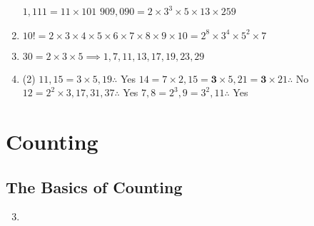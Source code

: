 \documentclass[12pt, A4]{article}
\begin{document}
\begin{enumerate}
\begin{tasks}
							\task
								\(1,111 = 11 \times 101\)
							\task
								\(909,090 = 2 \times 3^3 \times 5 \times 13 \times 259\)
						\end{tasks}
					\setcounter{enumi}{4}
					\item
						\(10! = 2 \times 3 \times 4 \times 5 \times 6 \times 7 \times 8 \times 9 \times 10 = 2^8 \times 3^4 \times 5^2 \times 7\)
					\setcounter{enumi}{14}
					\item
						\(30 = 2 \times 3 \times 5 \implies 1, 7, 11, 13, 17, 19, 23, 29\)
					\setcounter{enumi}{16}
					\item
						\begin{tasks}(2)
							\task
								\(11, 15 = 3 \times 5, 19 \therefore\) Yes
							\task
								\(14 = 7 \times 2, 15 = \bm{3} \times 5, 21 = \bm{3} \times 21 \therefore\) No
							\task
								\(12 = 2^2 \times 3, 17, 31, 37 \therefore\) Yes
							\task
								\(7, 8 = 2^3, 9 = 3^2, 11 \therefore\) Yes
						\end{tasks}
				\end{enumerate}
	\setcounter{section}{5}
	\section{Counting}
		\subsection{The Basics of Counting}
			\begin{enumerate}
				\setcounter{enumi}{2}
				\item	
			\end{enumerate}
		\setcounter{subsection}{2}
\end{document}
